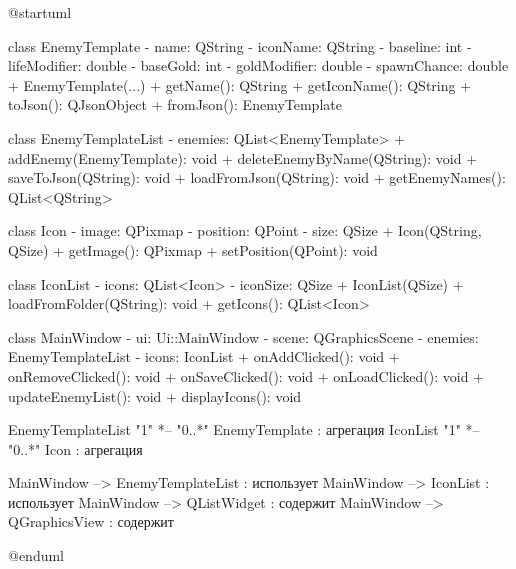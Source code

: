 @startuml

class EnemyTemplate {
    - name: QString
    - iconName: QString
    - baseline: int
    - lifeModifier: double
    - baseGold: int
    - goldModifier: double
    - spawnChance: double
    + EnemyTemplate(...)
    + getName(): QString
    + getIconName(): QString
    + toJson(): QJsonObject
    + fromJson(): EnemyTemplate
}

class EnemyTemplateList {
    - enemies: QList<EnemyTemplate>
    + addEnemy(EnemyTemplate): void
    + deleteEnemyByName(QString): void
    + saveToJson(QString): void
    + loadFromJson(QString): void
    + getEnemyNames(): QList<QString>
}

class Icon {
    - image: QPixmap
    - position: QPoint
    - size: QSize
    + Icon(QString, QSize)
    + getImage(): QPixmap
    + setPosition(QPoint): void
}

class IconList {
    - icons: QList<Icon>
    - iconSize: QSize
    + IconList(QSize)
    + loadFromFolder(QString): void
    + getIcons(): QList<Icon>
}

class MainWindow {
    - ui: Ui::MainWindow
    - scene: QGraphicsScene
    - enemies: EnemyTemplateList
    - icons: IconList
    + onAddClicked(): void
    + onRemoveClicked(): void
    + onSaveClicked(): void
    + onLoadClicked(): void
    + updateEnemyList(): void
    + displayIcons(): void
}

EnemyTemplateList "1" *-- "0..*" EnemyTemplate : агрегация
IconList "1" *-- "0..*" Icon : агрегация

MainWindow --> EnemyTemplateList : использует
MainWindow --> IconList : использует
MainWindow --> QListWidget : содержит
MainWindow --> QGraphicsView : содержит

@enduml
